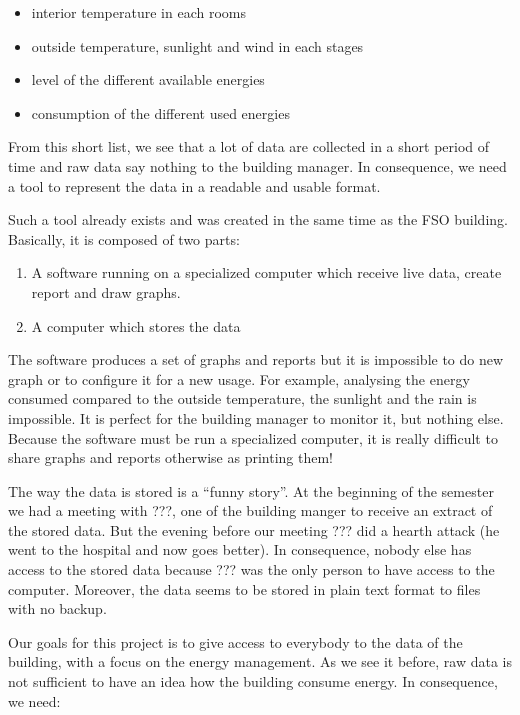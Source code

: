 \documentclass{acm_proc_article-sp}
\begin{document}
\begin{itemize}
\item interior temperature in each rooms
\item outside temperature, sunlight and wind in each stages
\item level of the different available energies
\item consumption of the different used energies
\end{itemize}
 
From this short list, we see that a lot of data are collected in a short period of time and raw data say nothing to the building manager. In consequence, we need a tool to represent the data in a readable and usable format.

Such a tool already exists and was created in the same time as the FSO building. Basically, it is composed of two parts: 

\begin{enumerate}
\item A software running on a specialized computer which receive live data, create report and draw graphs.
\item A computer which stores the data
\end{enumerate}

The software produces a set of graphs and reports but it is impossible to do new graph or to configure it for a new usage. For example, analysing the energy consumed compared to the outside temperature, the sunlight and the rain is impossible. It is perfect for the building manager to monitor it, but nothing else. Because the software must be run a specialized computer, it is really difficult to share graphs and reports otherwise as printing them!

The way the data is stored is a \enquote{funny story}. At the beginning of the semester we had a meeting with  ???, one of the building manger to receive an extract of the stored data. But the evening before our meeting ??? did a hearth attack (he went to the hospital and now goes better). In consequence, nobody else has access to the stored data because ??? was the only person to have access to the computer. Moreover, the data seems to be stored in plain text format to files with no backup.

Our goals for this project is to give access to everybody to the data of the building, with a focus on the energy management. As we see it before, raw data is not sufficient to have an idea how the building consume energy. In consequence, we need:
\end{document}
